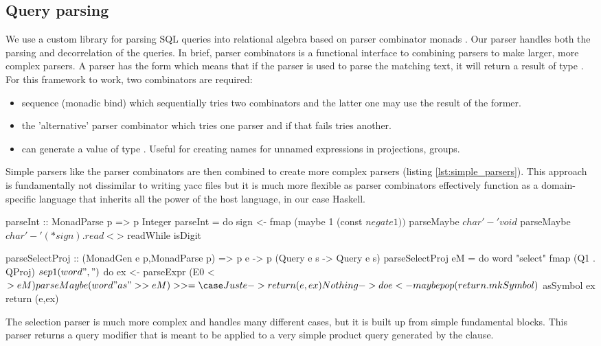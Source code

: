 \subsection{Query parsing}
\label{sec:query_parsing}

We use a custom library for parsing SQL queries into relational
algebra based on parser combinator monads
\cite{leijenParsecDirectStyle}. Our parser handles both the parsing
and decorrelation of the queries. In brief, parser combinators is a
functional interface to combining parsers to make larger, more complex parsers. A
parser  has the form  which means that if the parser
is used to parse the matching text, it will return a result of type
. For this framework to work, two combinators are required:

\begin{itemize}
\item sequence (monadic bind)  which sequentially tries two combinators and the latter one may
  use the result of the former.
\item the 'alternative' parser combinator  which tries one parser and if that fails tries another.
\item {} can generate a value of type . Useful for creating names for unnamed expressions in
  projections, groups.
\end{itemize}

Simple parsers like the  parser combinators are then
combined to create more complex parsers (listing
\ref{lst:simple_parsers}). This approach is fundamentally not
dissimilar to writing yacc files but it is much more flexible as parser combinators
effectively function as a domain-specific language that inherits all the power of
the host language, in our case Haskell.

\begin{code}
  \begin{haskellcode}
    parseInt :: MonadParse p => p Integer
    parseInt = do
      sign <- fmap (maybe 1 (const $ negate 1)) $ parseMaybe $ char '-'
      void $ parseMaybe $ char '-'
      (* sign) . read <$> readWhile isDigit

    parseSelectProj
      :: (MonadGen e p,MonadParse p)
      => p e -> p (Query e s -> Query e s)
    parseSelectProj eM = do
      word "select"
      fmap (Q1 . QProj) $ sep1 (word ",") $ do
      ex <- parseExpr (E0 <$> eM)
      parseMaybe (word "as" >> eM) >>= \case
        Just e -> return (e,ex)
        Nothing -> do
      e <- maybe pop (return . mkSymbol) $ asSymbol ex
      return (e,ex)
  \end{haskellcode}
  \caption{\label{lst:simple_parse}The selection parser is much more complex
    and handles many different cases, but it is built up from simple
    fundamental blocks. This parser returns a query modifier that is
    meant to be applied to a very simple product query generated by the
     clause.}
\end{code}

